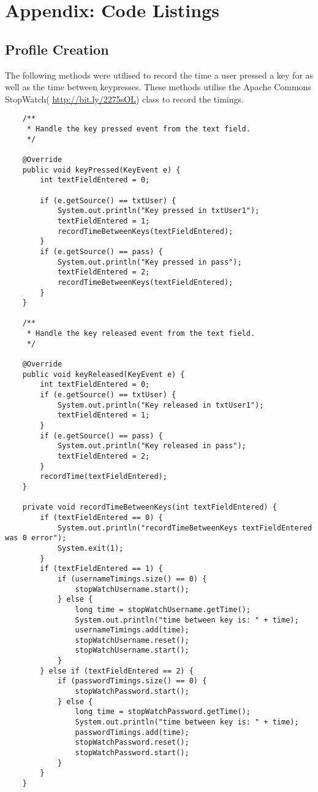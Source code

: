 \documentclass{article}
\begin{document}
\section{Appendix: Code Listings} \label{appendix}

\subsection{Profile Creation}
The following methods were utilised to record the time a user pressed a key for as well as the time between keypresses. These methods utilise the Apache Commons StopWatch( \url{http://bit.ly/2275sOL}) class to record the timings.  

\begin{lstlisting}
    /**
     * Handle the key pressed event from the text field.
     */

    @Override
    public void keyPressed(KeyEvent e) {
        int textFieldEntered = 0;

        if (e.getSource() == txtUser) {
            System.out.println("Key pressed in txtUser1");
            textFieldEntered = 1;
            recordTimeBetweenKeys(textFieldEntered);
        }
        if (e.getSource() == pass) {
            System.out.println("Key pressed in pass");
            textFieldEntered = 2;
            recordTimeBetweenKeys(textFieldEntered);
        }
    }

    /**
     * Handle the key released event from the text field.
     */

    @Override
    public void keyReleased(KeyEvent e) {
        int textFieldEntered = 0;
        if (e.getSource() == txtUser) {
            System.out.println("Key released in txtUser1");
            textFieldEntered = 1;
        }
        if (e.getSource() == pass) {
            System.out.println("Key released in pass");
            textFieldEntered = 2;
        }
        recordTime(textFieldEntered);
    }

    private void recordTimeBetweenKeys(int textFieldEntered) {
        if (textFieldEntered == 0) {
            System.out.println("recordTimeBetweenKeys textFieldEntered was 0 error");
            System.exit(1);
        }
        if (textFieldEntered == 1) {
            if (usernameTimings.size() == 0) {
                stopWatchUsername.start();
            } else {
                long time = stopWatchUsername.getTime();
                System.out.println("time between key is: " + time);
                usernameTimings.add(time);
                stopWatchUsername.reset();
                stopWatchUsername.start();
            }
        } else if (textFieldEntered == 2) {
            if (passwordTimings.size() == 0) {
                stopWatchPassword.start();
            } else {
                long time = stopWatchPassword.getTime();
                System.out.println("time between key is: " + time);
                passwordTimings.add(time);
                stopWatchPassword.reset();
                stopWatchPassword.start();
            }
        }
    }



\end{lstlisting}
\end{document}
